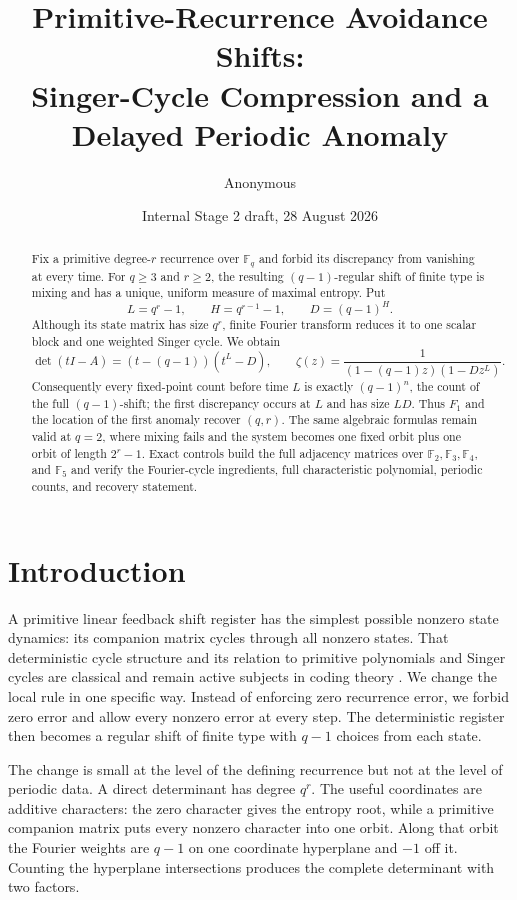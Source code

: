 \documentclass[11pt,a4paper]{amsart}
\title[Primitive-recurrence avoidance shifts]{Primitive-Recurrence Avoidance Shifts:\\
Singer-Cycle Compression and a Delayed Periodic Anomaly}
\author{Anonymous}
\date{Internal Stage 2 draft, 28 August 2026}
\theoremstyle{definition}
\theoremstyle{remark}
\newcommand{\F}{\mathbb F}
\begin{document}
\begin{abstract}
Fix a primitive degree-$r$ recurrence over $\F_q$ and forbid its discrepancy
from vanishing at every time.  For $q\geq3$ and $r\geq2$, the resulting
$(q-1)$-regular shift of finite type is mixing and has a unique, uniform
measure of maximal entropy.  Put
\[
 L=q^r-1,\qquad H=q^{r-1}-1,\qquad D=(q-1)^H.
\]
Although its state matrix has size $q^r$, finite Fourier transform reduces it
to one scalar block and one weighted Singer cycle.  We obtain
\[
 \det(tI-A)=(t-(q-1))(t^L-D),
 \qquad
 \zeta(z)=\frac{1}{(1-(q-1)z)(1-Dz^L)}.
\]
Consequently every fixed-point count before time $L$ is exactly
$(q-1)^n$, the count of the full $(q-1)$-shift; the first discrepancy occurs
at $L$ and has size $LD$.  Thus $F_1$ and the location of the first anomaly
recover $(q,r)$.  The same algebraic formulas remain valid at $q=2$, where
mixing fails and the system becomes one fixed orbit plus one orbit of length
$2^r-1$.  Exact controls build the full adjacency matrices over
$\F_2,\F_3,\F_4$, and $\F_5$ and verify the Fourier-cycle ingredients, full
characteristic polynomial, periodic counts, and recovery statement.
\end{abstract}

\maketitle

\section{Introduction}

A primitive linear feedback shift register has the simplest possible
nonzero state dynamics: its companion matrix cycles through all nonzero
states.  That deterministic cycle structure and its relation to primitive
polynomials and Singer cycles are classical and remain active subjects in
coding theory \cite{GhorpadeHasanKumari2011,ChangEzermanLingWang2018}.  We
change the local rule in one specific way.  Instead of enforcing zero
recurrence error, we forbid zero error and allow every nonzero error at every
step.  The deterministic register then becomes a regular shift of finite
type with $q-1$ choices from each state.

The change is small at the level of the defining recurrence but not at the
level of periodic data.  A direct determinant has degree $q^r$.  The useful
coordinates are additive characters: the zero character gives the entropy
root, while a primitive companion matrix puts every nonzero character into
one orbit.  Along that orbit the Fourier weights are $q-1$ on one coordinate
hyperplane and $-1$ off it.  Counting the hyperplane intersections produces
the complete determinant with two factors.
\end{document}
